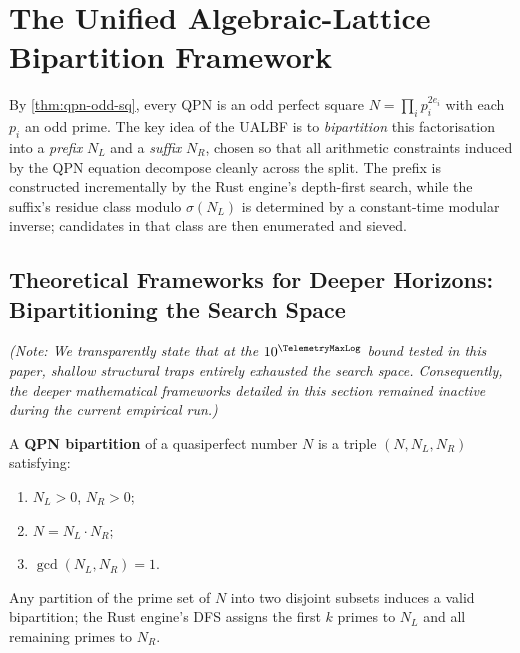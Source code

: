 \section{The Unified Algebraic-Lattice Bipartition Framework}
\label{sec:ualbf}

By \cref{thm:qpn-odd-sq}, every QPN is an odd perfect square
$N = \prod_{i} p_i^{2e_i}$
with each $p_i$ an odd prime.  The key idea of the UALBF is to
\emph{bipartition} this factorisation into a \emph{prefix} $N_L$ and a
\emph{suffix} $N_R$, chosen so that all arithmetic constraints induced by the
QPN equation decompose cleanly across the split.  The prefix is constructed
incrementally by the Rust engine's depth-first search, while the suffix's
residue class modulo $\sigma(N_L)$ is determined by a constant-time
modular inverse; candidates in that class are then enumerated and sieved.

\subsection{Theoretical Frameworks for Deeper Horizons: Bipartitioning the Search Space}
\label{subsec:bipartition}

\emph{(Note: We transparently state that at the $10^{\TelemetryMaxLog}$ bound tested in this paper, shallow structural traps entirely exhausted the search space. Consequently, the deeper mathematical frameworks detailed in this section remained inactive during the current empirical run.)}

\begin{definition}\label{def:bipartition}
A \textbf{QPN bipartition} of a quasiperfect number $N$ is a triple
$(N, N_L, N_R)$ satisfying:
\begin{enumerate}
  \item $N_L > 0$, $N_R > 0$;
  \item $N = N_L \cdot N_R$;
  \item $\gcd(N_L, N_R) = 1$.
\end{enumerate}
Any partition of the prime set of $N$ into two disjoint subsets induces
a valid bipartition; the Rust engine's DFS assigns the first $k$ primes
to $N_L$ and all remaining primes to $N_R$.
\end{definition}


